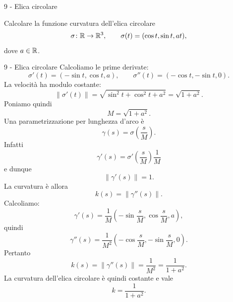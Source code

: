 \documentclass[a4paper]{article}
\begin{document}
\begin{snippetexercise}{9 - Elica circolare}
    \begin{figure}
        \centering
        \begin{minipage}{0.48\linewidth}
            \centering
        \end{minipage}
        \hfill
        \begin{minipage}{0.48\linewidth}
            \centering
        \end{minipage}
    \end{figure}
    Calcolare la funzione curvatura dell'elica circolare
    \[
        \sigma\colon\mathbb{R}\to\mathbb{R}^3,
        \qquad
        \sigma(t)=(\cos t,\sin t,at),
    \]
    dove \(a\in\mathbb{R}\). \wrapfill
\end{snippetexercise}

\begin{snippetsolution}{9 - Elica circolare}
    Calcoliamo le prime derivate:
    \[
        \sigma'(t)=(-\sin t,\cos t,a),
        \qquad
        \sigma''(t)=(-\cos t,-\sin t,0).
    \]
    La velocità ha modulo costante:
    \[
        \left\|\sigma'(t)\right\|
        =
        \sqrt{\sin^2t+\cos^2t+a^2}
        =
        \sqrt{1+a^2}.
    \]
    Poniamo quindi
    \[
        M=\sqrt{1+a^2}.
    \]
    Una parametrizzazione per lunghezza d'arco è
    \[
        \gamma(s)=\sigma\left(\frac{s}{M}\right).
    \]
    Infatti
    \[
        \gamma'(s)=\sigma'\left(\frac{s}{M}\right)\frac1M
    \]
    e dunque
    \[
        \left\|\gamma'(s)\right\|=1.
    \]
    La curvatura è allora
    \[
        k(s)=\left\|\gamma''(s)\right\|.
    \]
    Calcoliamo:
    \[
        \gamma'(s)
        =
        \frac1M
        \left(
            -\sin\frac{s}{M},
            \cos\frac{s}{M},
            a
        \right),
    \]
    quindi
    \[
        \gamma''(s)
        =
        \frac1{M^2}
        \left(
            -\cos\frac{s}{M},
            -\sin\frac{s}{M},
            0
        \right).
    \]
    Pertanto
    \[
        k(s)
        =
        \left\|\gamma''(s)\right\|
        =
        \frac1{M^2}
        =
        \frac1{1+a^2}.
    \]
    La curvatura dell'elica circolare è quindi costante e vale
    \[
        k=\frac1{1+a^2}.
    \]
\end{snippetsolution}
\end{document}
